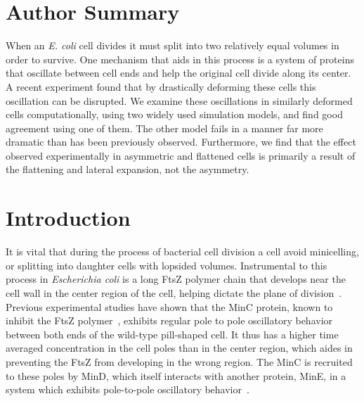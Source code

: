 \documentclass[10pt,letterpaper]{article}
\newcommand{\changed}[1]{{\color{red}#1}}
\begin{document}
\section*{Author Summary}
  When an \changed{\emph{E. coli}} cell divides it must split into two relatively equal
  volumes in order to survive.  One mechanism that aids in this
  process is a system of proteins that oscillate between cell ends and
  help the original cell divide along its center.  A recent experiment
  found that by drastically deforming these cells this oscillation can
  be disrupted.  We examine these oscillations in similarly deformed
  cells computationally, using two widely used simulation models, and
  find good agreement using one of them.  The other model fails in a
  manner far more dramatic than has been previously observed.
  Furthermore, we find that the effect observed experimentally in
  asymmetric and flattened cells is primarily a result of the
  flattening and lateral expansion, not the asymmetry.

\linenumbers

\section*{Introduction}
It is vital that during the process of bacterial cell
division a cell avoid minicelling, or splitting into daughter cells
with lopsided volumes.  Instrumental to this process in
\emph{Escherichia coli} is a long FtsZ polymer chain that develops
near
the cell wall in the center region of the cell, helping dictate the
plane of division~\cite{adams2009bacterial,
  lutkenhaus2007assembly}. Previous experimental studies have shown
that the MinC protein, known to inhibit the FtsZ
polymer~\cite{shen2010examination}, exhibits regular pole to pole
oscillatory behavior between both ends of the wild-type pill-shaped
cell.  It thus has a higher time averaged concentration in the cell
poles than in the center region, which aides in preventing the FtsZ
from developing in the wrong region.  The MinC is recruited to these
poles by MinD, which itself interacts with another protein, MinE, in a
system which exhibits pole-to-pole oscillatory
behavior~\cite{shapiro2009and, yu1999ftsz,
  meacci2005min,huang2003dynamic,kerr2006division,mannik2009bacterial}.
\end{document}
